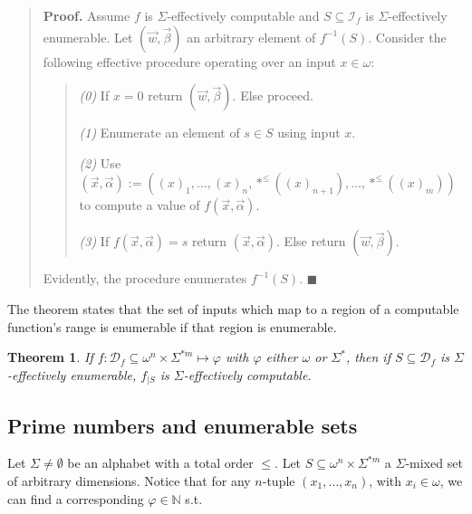 \documentclass[a4paper, 12pt]{article}
\newtheorem{theorem}{Theorem}
\newtheorem{theorem}{Theorem}
\begin{document}
\small
\begin{quote}

\textbf{Proof.} Assume $f$ is $\Sigma$-effectively computable and $S \subseteq
\mathcal{I}_f$ is $\Sigma$-effectively enumerable. Let $(\vec{w}, \vec{\beta}) $
an arbitrary element of $f^{-1}(S)$. Consider the following
effective procedure operating over an input $x \in \omega$: 

\begin{quote}

    \textit{(0)} If $x = 0$ return $(\vec{w}, \vec{\beta})$. Else proceed.

    \textit{(1)} Enumerate an element of $s \in S$ using input $x$. 

    \textit{(2)} Use $(\vec{x}, \vec{\alpha}) := ( (x)_1, \ldots, (x)_n, *^{\leq}( (x)_{n+1}), \ldots,
    *^{\leq}( (x)_m ))$ to compute a value of $f(\vec{x}, \vec{\alpha})$. 

    \textit{(3)} If $f(\vec{x}, \vec{\alpha}) = s$ return $(\vec{x},
    \vec{\alpha}) $. Else return $(\vec{w}, \vec{\beta}) $.
\end{quote}

Evidently, the procedure enumerates $f^{-1}(S)$. $\blacksquare$

\end{quote}
\normalsize


The theorem states that the set of inputs which map to a region of a computable
function's range is enumerable if that region is enumerable.

\begin{theorem}
    If $f : \mathcal{D}_f \subseteq \omega^{n} \times \Sigma^{*m} \mapsto
    \varphi$ with $\varphi$ either $\omega$ or $\Sigma^{*}$, then if $S
    \subseteq \mathcal{D}_f$ is $\Sigma$-effectively enumerable, $f_{| S}$ is
    $\Sigma$-effectively computable.
\end{theorem}



\subsection{Prime numbers and enumerable sets}

Let $\Sigma \neq \emptyset$ be an alphabet with a total order $\leq$. Let $S
\subseteq \omega^{n} \times \Sigma^{*m}$ a $\Sigma$-mixed set of arbitrary
dimensions. Notice that for any $n$-tuple $(x_1, \ldots, x_n)$, with $x_i \in
\omega$, we can find a corresponding $\varphi \in \mathbb{N}$ s.t. 
\end{document}
